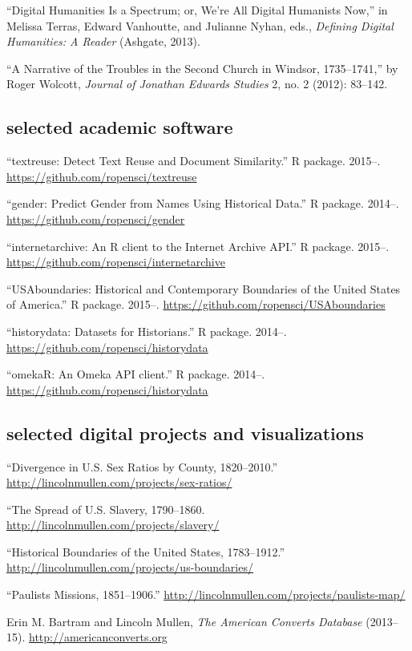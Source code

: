 \documentclass[11pt]{article}
\begin{document}
``Digital Humanities Is a Spectrum; or, We're All Digital Humanists
Now,'' in Melissa Terras, Edward Vanhoutte, and Julianne Nyhan, eds.,
\emph{Defining Digital Humanities: A Reader} (Ashgate, 2013).

``A Narrative of the Troubles in the Second Church in Windsor,
1735--1741,'' by Roger Wolcott, \emph{Journal of Jonathan Edwards
  Studies} 2, no. 2 (2012): 83--142.

\subsection{selected academic software}\label{academic-software}

``textreuse: Detect Text Reuse and Document Similarity.'' R package. 2015--. 
\url{https://github.com/ropensci/textreuse}

``gender: Predict Gender from Names Using Historical Data.'' R package. 
2014--. \url{https://github.com/ropensci/gender}

``internetarchive: An R client to the Internet Archive API.'' R package.  
2015--. \url{https://github.com/ropensci/internetarchive}

``USAboundaries: Historical and Contemporary Boundaries of the United States 
of America.'' R package.  2015--.  
\url{https://github.com/ropensci/USAboundaries}

``historydata: Datasets for Historians.'' R package. 2014--.  
\url{https://github.com/ropensci/historydata}

``omekaR: An Omeka API client.'' R package. 2014--. 
\url{https://github.com/ropensci/historydata}

\subsection{selected digital projects and visualizations}\label{digital-projects}

``Divergence in U.S. Sex Ratios by County, 1820--2010.'' \url{http://lincolnmullen.com/projects/sex-ratios/}

``The Spread of U.S.  Slavery, 1790--1860. 
\url{http://lincolnmullen.com/projects/slavery/}

``Historical Boundaries of the United States, 1783--1912.'' \url{http://lincolnmullen.com/projects/us-boundaries/}

``Paulists Missions, 1851--1906.'' \url{http://lincolnmullen.com/projects/paulists-map/}

Erin M. Bartram and Lincoln Mullen, \emph{The American Converts Database} 
(2013--15). \url{http://americanconverts.org}
\end{document}
